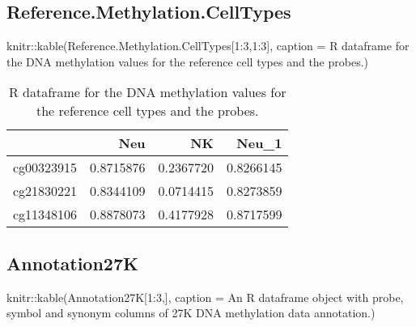 \documentclass[]{article}
\newcommand{\hlnum}[1]{\textcolor[rgb]{0.816,0.125,0.439}{#1}}%
\newcommand{\hlstr}[1]{\textcolor[rgb]{0.251,0.627,0.251}{#1}}%
\newcommand{\hlstd}[1]{\textcolor[rgb]{0.251,0.251,0.251}{#1}}%
\newenvironment{Shaded}{\begin{myshaded}}{\end{myshaded}}
\newcommand{\DecValTok}[1]{\hlnum{#1}}
\newcommand{\SpecialCharTok}[1]{\hlstr{#1}}
\newcommand{\StringTok}[1]{\hlstr{#1}}
\newcommand{\FunctionTok}[1]{\hlstd{#1}}
\newcommand{\AttributeTok}[1]{{#1}}
\newcommand{\NormalTok}[1]{\hlstd{#1}}
\begin{document}
\hypertarget{reference.methylation.celltypes}{%
\subsection{\texorpdfstring{ Reference.Methylation.CellTypes}{  Reference.Methylation.CellTypes}}\label{reference.methylation.celltypes}}

\begin{Shaded}
\begin{Highlighting}[]
\NormalTok{knitr}\SpecialCharTok{::}\FunctionTok{kable}\NormalTok{(Reference.Methylation.CellTypes[}\DecValTok{1}\SpecialCharTok{:}\DecValTok{3}\NormalTok{,}\DecValTok{1}\SpecialCharTok{:}\DecValTok{3}\NormalTok{], }\AttributeTok{caption =} \StringTok{\textquotesingle{}R dataframe for the DNA methylation values for the reference cell types and the probes.\textquotesingle{}}\NormalTok{)}
\end{Highlighting}
\end{Shaded}

\begin{table}

\caption{\label{tab:unnamed-chunk-60}R dataframe for the DNA methylation values for the reference cell types and the probes.}
\centering
\begin{tabular}[t]{l|r|r|r}
\hline
  & Neu & NK & Neu\_1\\
\hline
cg00323915 & 0.8715876 & 0.2367720 & 0.8266145\\
\hline
cg21830221 & 0.8344109 & 0.0714415 & 0.8273859\\
\hline
cg11348106 & 0.8878073 & 0.4177928 & 0.8717599\\
\hline
\end{tabular}
\end{table}

\hypertarget{annotation27k}{%
\subsection{\texorpdfstring{ Annotation27K}{  Annotation27K}}\label{annotation27k}}

\begin{Shaded}
\begin{Highlighting}[]
\NormalTok{knitr}\SpecialCharTok{::}\FunctionTok{kable}\NormalTok{(Annotation27K[}\DecValTok{1}\SpecialCharTok{:}\DecValTok{3}\NormalTok{,], }\AttributeTok{caption =} \StringTok{\textquotesingle{}An R dataframe object with probe, symbol and synonym columns of 27K DNA methylation data annotation.\textquotesingle{}}\NormalTok{)}
\end{Highlighting}
\end{Shaded}
\end{document}
